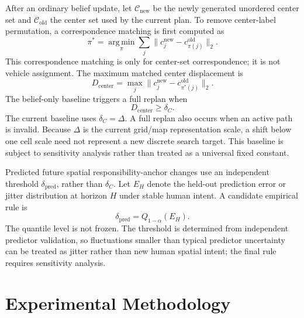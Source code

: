 \documentclass[letterpaper, 10pt, conference]{ieeeconf}
\begin{document}
After an ordinary belief update, let \(\mathcal{C}_{\mathrm{new}}\) be the newly generated unordered center set and \(\mathcal{C}_{\mathrm{old}}\) the center set used by the current plan. To remove center-label permutation, a correspondence matching is first computed as
\begin{equation}
  \pi^\ast = \operatorname*{arg\,min}_{\pi}
  \sum_j \lVert c_j^{\mathrm{new}}-c_{\pi(j)}^{\mathrm{old}}\rVert_2.
  \label{eq:center_correspondence}
\end{equation}
This correspondence matching is only for center-set correspondence; it is not vehicle assignment. The maximum matched center displacement is
\begin{equation}
  D_{\mathrm{center}} =
  \max_j\lVert c_j^{\mathrm{new}}-c_{\pi^\ast(j)}^{\mathrm{old}}\rVert_2.
  \label{eq:center_displacement}
\end{equation}
The belief-only baseline triggers a full replan when
\begin{equation}
  D_{\mathrm{center}} \geq \delta_C.
  \label{eq:belief_replan_gate}
\end{equation}
The current baseline uses \(\delta_C=\Delta\). A full replan also occurs when an active path is invalid. Because \(\Delta\) is the current grid/map representation scale, a shift below one cell scale need not represent a new discrete search target. This baseline is subject to sensitivity analysis rather than treated as a universal fixed constant.

Predicted future spatial responsibility-anchor changes use an independent threshold \(\delta_{\mathrm{pred}}\), rather than \(\delta_C\). Let \(E_H\) denote the held-out prediction error or jitter distribution at horizon \(H\) under stable human intent. A candidate empirical rule is
\begin{equation}
  \delta_{\mathrm{pred}} = Q_{1-\alpha}(E_H).
  \label{eq:prediction_replan_gate}
\end{equation}
The quantile level is not frozen. The threshold is determined from independent predictor validation, so fluctuations smaller than typical predictor uncertainty can be treated as jitter rather than new human spatial intent; the final rule requires sensitivity analysis.

\section{Experimental Methodology}
\end{document}
